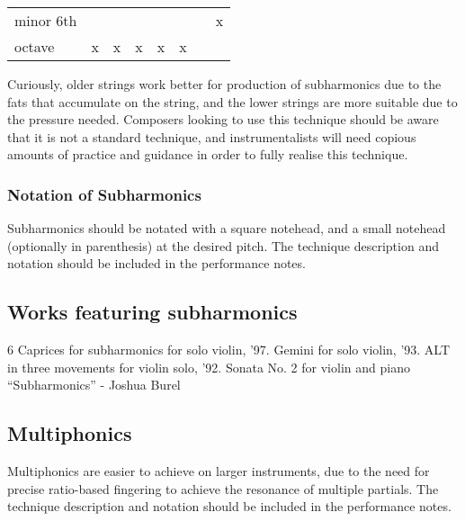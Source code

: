 \begin{table}[]
{\begin{tabular}{llllllll}
    minor 6th                                                                                             &                         &                       &                       &                       &                       &                       & x                     \\
    octave                                                                                                & x                       & x                     & x                     & x                     & x                     &                       &                      
    \end{tabular}%
    }
    \end{table}

    Curiously, older strings work better for production of subharmonics due to the fats that accumulate on the string, and the lower strings are more suitable due to the pressure needed.\autocite{kimuraHowProduceSubharmonics1999}
Composers looking to use this technique should be aware that it is not a standard technique, and instrumentalists will need copious amounts of practice and guidance in order to fully realise this technique.

\subsubsection{Notation of Subharmonics}
Subharmonics should be notated with a square notehead, and a small notehead (optionally in parenthesis) at the desired pitch.
The technique description and notation should be included in the performance notes.

\subsection{Works featuring subharmonics}

6 Caprices for subharmonics for solo violin, '97.
Gemini for solo violin, '93.
ALT in three movements for violin solo, '92.
Sonata No. 2 for violin and piano “Subharmonics” - Joshua Burel

\subsection{Multiphonics}
Multiphonics are easier to achieve on larger instruments, due to the need for precise ratio-based fingering to achieve the resonance of multiple partials.
The technique description and notation should be included in the performance notes.
\lipsum[4]

